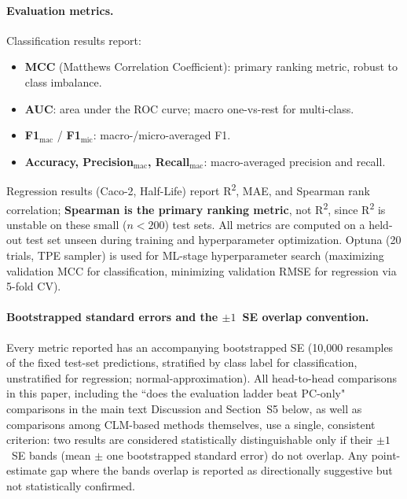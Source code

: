 \documentclass[9pt,a4paper]{article}
\begin{document}
\paragraph{Evaluation metrics.}
Classification results report:
\begin{itemize}[leftmargin=2em]
  \item \textbf{MCC} (Matthews Correlation Coefficient): primary ranking metric,
    robust to class imbalance.
  \item \textbf{AUC}: area under the ROC curve; macro one-vs-rest for multi-class.
  \item \textbf{F1$_\text{mac}$} / \textbf{F1$_\text{mic}$}: macro-/micro-averaged F1.
  \item \textbf{Accuracy, Precision$_\text{mac}$, Recall$_\text{mac}$}:
    macro-averaged precision and recall.
\end{itemize}
Regression results (Caco-2, Half-Life) report R\textsuperscript{2}, MAE, and Spearman
rank correlation; \textbf{Spearman is the primary ranking metric}, not R\textsuperscript{2},
since R\textsuperscript{2} is unstable on these small ($n<200$) test sets.
All metrics are computed on a held-out test set unseen during training and
hyperparameter optimization.
Optuna (20 trials, TPE sampler) is used for ML-stage hyperparameter search
(maximizing validation MCC for classification, minimizing validation RMSE for
regression via 5-fold CV).

\paragraph{Bootstrapped standard errors and the $\pm1$~SE overlap convention.}
Every metric reported has an accompanying bootstrapped SE (10,000 resamples of the fixed test-set predictions, stratified by class label for classification, unstratified for regression; normal-approximation). All head-to-head comparisons in this paper, including the ``does the evaluation ladder beat PC-only" comparisons in the main text Discussion and Section~S5 below,
as well as comparisons among CLM-based methods themselves, use a single, consistent
criterion: two results are considered statistically distinguishable only if their
$\pm1$~SE bands (mean $\pm$ one bootstrapped standard error) do not overlap. Any
point-estimate gap where the bands overlap is reported as directionally suggestive
but not statistically confirmed.

\end{document}
